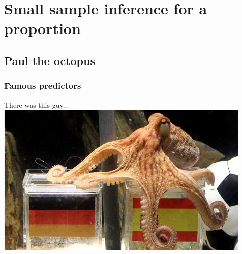 
\section{Small sample inference for a proportion}


\subsection{Paul the octopus}


\begin{frame}
\frametitle{Famous predictors}

{
\pause
There was this guy...
\includegraphics[width=\textwidth]{6-5_small_single_prop/figures/paul/paul}
}

\end{frame}

